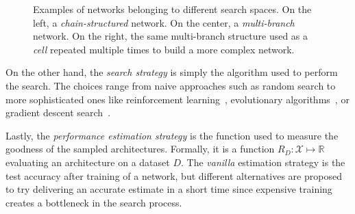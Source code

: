 \begin{figure}[ht]
\begin{center}
\caption{Examples of networks belonging to different search spaces. On the left, a \textit{chain-structured} network. On the center, a \textit{multi-branch} network. On the right, the same multi-branch structure used as a \textit{cell} repeated multiple times to build a more complex network.}
\label{fig:preliminaries:ss}
\end{center}
\end{figure}


On the other hand, the \textit{search strategy} is simply the algorithm used to perform the search. The choices range from naive approaches such as random search to more sophisticated ones like reinforcement learning~\citep{BakerNAS, ZophNAS1}, evolutionary algorithms~\citep{AmoebaNet}, or gradient descent search~\citep{DARTS}.

Lastly, the \textit{performance estimation strategy} is the function used to measure the goodness of the sampled architectures. Formally, it is a function $R_{D}: \mathcal{X} \mapsto \mathbb{R}$ evaluating an architecture on a dataset $D$. The \textit{vanilla} estimation strategy is the test accuracy after training of a network, but different alternatives are proposed to try delivering an accurate estimate in a short time since expensive training creates a bottleneck in the search process.